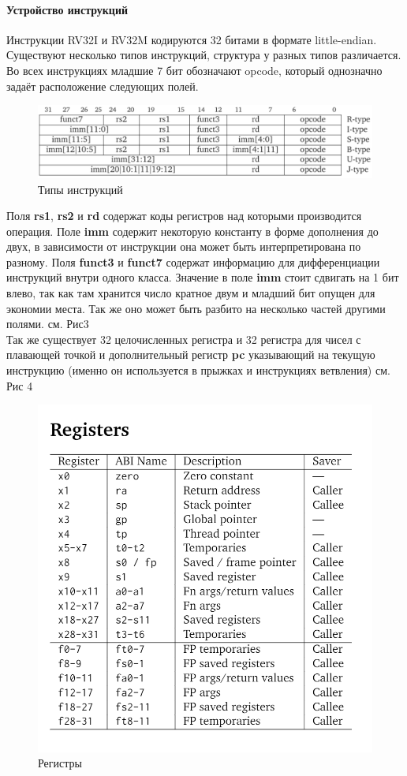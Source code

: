 \documentclass{article}
\begin{document}
\paragraph{Устройство инструкций}
Инструкции RV32I и RV32M кодируются 32 битами в формате little-endian. Существуют несколько типов инструкций, структура у разных типов различается. Во всех инструкциях младшие 7 бит обозначают opcode, который однозначно задаёт расположение следующих полей. 
\\
\begin{figure}[H]
	\includegraphics[width=1\textwidth]{pictures/instructionTypes}
	\caption{Типы инструкций}
\end{figure}
Поля \textbf{rs1}, \textbf{rs2} и \textbf{rd} содержат коды регистров над которыми производится операция. Поле \textbf{imm} содержит некоторую константу в форме дополнения до двух, в зависимости от инструкции она может быть интерпретирована по разному. Поля \textbf{funct3} и \textbf{funct7} содержат информацию для дифференциации инструкций внутри одного класса. Значение в поле \textbf{imm} стоит сдвигать на 1 бит влево, так как там хранится число кратное двум и младший бит опущен для экономии места. Так же оно может быть разбито на несколько частей другими полями. см. Рис3\\
Так же существует 32 целочисленных регистра и 32 регистра для чисел с плавающей точкой и дополнительный регистр \textbf{pc} указывающий на текущую инструкцию (именно он используется в прыжках и инструкциях ветвления) см. Рис 4
\begin{figure}[H]
	\includegraphics[width=1\textwidth]{pictures/registers}
	\caption{Регистры}
\end{figure}
\end{document}
